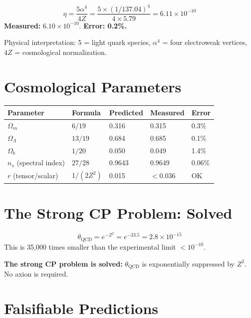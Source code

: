 \documentclass[11pt,a4paper]{article}
\theoremstyle{plain}
\theoremstyle{definition}
\theoremstyle{remark}
\newcommand{\Omegam}{\Omega_m}
\newcommand{\OmegaL}{\Omega_\Lambda}
\begin{document}
\[
\eta = \frac{5\alpha^4}{4Z} = \frac{5 \times (1/137.04)^4}{4 \times 5.79} = 6.11 \times 10^{-10}
\]
\textbf{Measured:} $6.10 \times 10^{-10}$. \textbf{Error: 0.2\%.}

Physical interpretation: 5 = light quark species, $\alpha^4$ = four electroweak vertices, $4Z$ = cosmological normalization.

\section{Cosmological Parameters}

\begin{table}[h!]
\centering
\begin{tabular}{lllll}
\toprule
\textbf{Parameter} & \textbf{Formula} & \textbf{Predicted} & \textbf{Measured} & \textbf{Error} \\
\midrule
$\Omegam$ & $6/19$ & 0.316 & 0.315 & 0.3\% \\
$\OmegaL$ & $13/19$ & 0.684 & 0.685 & 0.1\% \\
$\Omega_b$ & $1/20$ & 0.050 & 0.049 & 1.4\% \\
$n_s$ (spectral index) & $27/28$ & 0.9643 & 0.9649 & 0.06\% \\
$r$ (tensor/scalar) & $1/(2Z^2)$ & 0.015 & $<0.036$ & OK \\
\bottomrule
\end{tabular}
\end{table}

\section{The Strong CP Problem: Solved}

\[
\theta_{\text{QCD}} = e^{-Z^2} = e^{-33.5} = 2.8 \times 10^{-15}
\]
This is 35,000 times smaller than the experimental limit $< 10^{-10}$.

\textbf{The strong CP problem is solved:} $\theta_{\text{QCD}}$ is exponentially suppressed by $Z^2$. No axion is required.

\section{Falsifiable Predictions}
\end{document}
